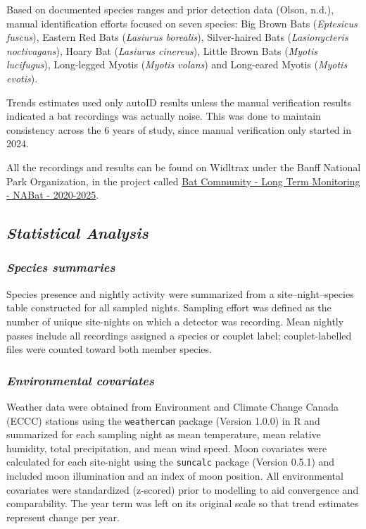 \documentclass[
  letterpaper,
  DIV=11,
  numbers=noendperiod]{scrartcl}
\begin{document}
Based on documented species ranges and prior detection data (Olson,
n.d.), manual identification efforts focused on seven species: Big Brown
Bats (\emph{Eptesicus fuscus}), Eastern Red Bats (\emph{Lasiurus
borealis}), Silver-haired Bats (\emph{Lasionycteris noctivagans}), Hoary
Bat (\emph{Lasiurus cinereus}), Little Brown Bats (\emph{Myotis
lucifugus}), Long-legged Myotis (\emph{Myotis volans}) and Long-eared
Myotis (\emph{Myotis evotis}).

Trends estimates used only autoID results unless the manual verification
results indicated a bat recordings was actually noise. This was done to
maintain consistency across the 6 years of study, since manual
verification only started in 2024.

All the recordings and results can be found on Widltrax under the Banff
National Park Organization, in the project called
\href{https://portal.wildtrax.ca/aru/3026}{Bat Community - Long Term
Monitoring - NABat - 2020-2025}.

\subsection{\texorpdfstring{\emph{Statistical
Analysis}}{Statistical Analysis}}\label{statistical-analysis}

\subsubsection{\texorpdfstring{\emph{Species
summaries}}{Species summaries}}\label{species-summaries}

Species presence and nightly activity were summarized from a
site--night--species table constructed for all sampled nights. Sampling
effort was defined as the number of unique site-nights on which a
detector was recording. Mean nightly passes include all recordings
assigned a species or couplet label; couplet-labelled files were counted
toward both member species.

\subsubsection{\texorpdfstring{\emph{Environmental
covariates}}{Environmental covariates}}\label{environmental-covariates}

Weather data were obtained from Environment and Climate Change Canada
(ECCC) stations using the \texttt{weathercan} package (Version 1.0.0) in
R and summarized for each sampling night as mean temperature, mean
relative humidity, total precipitation, and mean wind speed. Moon
covariates were calculated for each site-night using the
\texttt{suncalc} package (Version 0.5.1) and included moon illumination
and an index of moon position. All environmental covariates were
standardized (z-scored) prior to modelling to aid convergence and
comparability. The year term was left on its original scale so that
trend estimates represent change per year.
\end{document}
